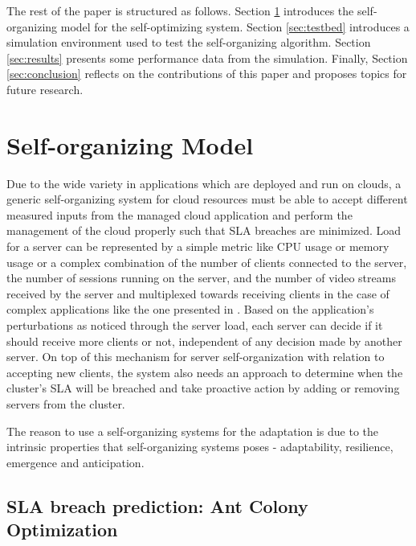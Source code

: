 \documentclass[conference]{IEEEtran}
\begin{document}
The rest of the paper is structured as follows. Section \ref{sec:selforganizingmodel} introduces the self-organizing model for the self-optimizing system. Section \ref{sec:testbed} introduces a simulation environment used to test the self-organizing algorithm. Section \ref{sec:results} presents some performance data from the simulation. Finally, Section \ref{sec:conclusion} reflects on the contributions of this paper and proposes topics for future research.

\section{Self-organizing Model}
\label{sec:selforganizingmodel}
 
Due to the wide variety in applications which are deployed and run on clouds, a generic self-organizing system for cloud resources must be able to accept different measured inputs from the managed cloud application and perform the management of the cloud properly such that SLA breaches are minimized. Load for a server can be represented by a simple metric like CPU usage or memory usage or a complex combination of the number of clients connected to the server, the number of sessions running on the server, and the number of video streams received by the server and multiplexed towards receiving clients in the case of complex applications like the one presented in \cite{bogdan:miles2012chapter}. Based on the application's perturbations as noticed through the server load, each server can decide if it should receive more clients or not, independent of any decision made by another server. On top of this mechanism for server self-organization with relation to accepting new clients, the system also needs an approach to determine when the cluster's SLA will be breached and take proactive action by adding or removing servers from the cluster.

The reason to use a self-organizing systems for the adaptation is due to the intrinsic properties that self-organizing systems poses - adaptability, resilience, emergence and anticipation.

\subsection{SLA breach prediction: Ant Colony Optimization}
\end{document}
